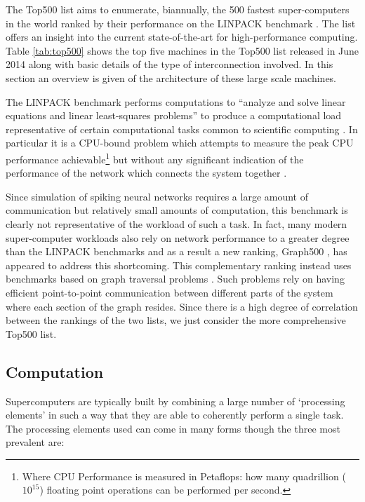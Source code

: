 		The Top500 list \cite{meuer14j} aims to enumerate, biannually, the 500
		fastest super-computers in the world ranked by their performance on the
		LINPACK benchmark \cite{dongarraLINPAC}. The list offers an insight into the
		current state-of-the-art for high-performance computing. Table
		\ref{tab:top500} shows the top five machines in the Top500 list released in
		June 2014 along with basic details of the type of interconnection
		involved. In this section an overview is given of the architecture of these
		large scale machines.
		
		The LINPACK benchmark performs computations to ``analyze and solve linear
		equations and linear least-squares problems'' to produce a computational
		load representative of certain computational tasks common to scientific
		computing \cite{dongarra84}. In particular it is a CPU-bound problem which
		attempts to measure the peak CPU performance achievable\footnote{Where CPU
		Performance is measured in Petaflops: how many quadrillion ($10^{15}$)
		floating point operations can be performed per second.} but without any
		significant indication of the performance of the network which connects the
		system together \cite{dongarra07}.
		
		Since simulation of spiking neural networks requires a large amount of
		communication but relatively small amounts of computation, this benchmark is
		clearly not representative of the workload of such a task.  In fact, many
		modern super-computer workloads also rely on network performance to a
		greater degree than the LINPACK benchmarks and as a result a new ranking,
		Graph500 \cite{murphy13n}, has appeared to address this shortcoming. This
		complementary ranking instead uses benchmarks based on graph traversal
		problems \cite{murphy10}. Such problems rely on having efficient
		point-to-point communication between different parts of the system where
		each section of the graph resides. Since there is a high degree of
		correlation between the rankings of the two lists, we just consider the more
		comprehensive Top500 list.
		
		
		\subsection{Computation}
			
			Supercomputers are typically built by combining a large number of
			`processing elements' in such a way that they are able to coherently
			perform a single task. The processing elements used can come in many forms
			though the three most prevalent are:
			
